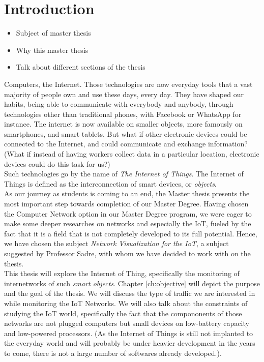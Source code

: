 \chapter*{Introduction}

\begin{itemize}
	\item Subject of master thesis
	\item Why this master thesis
	\item Talk about different sections of the thesis
\end{itemize}

Computers, the Internet. Those technologies are now everyday tools that a vast majority of people own and use these days, every day. They have shaped our habits, being able to communicate with everybody and anybody, through technologies other than traditional phones, with Facebook or WhatsApp for instance. The internet is now available on smaller objects, more famously on smartphones, and smart tablets. But what if other electronic devices could be connected to the Internet, and could communicate and exchange information? (What if instead of having workers collect data in a particular location, electronic devices could do this task for us?)\\

Such technologies go by the name of \textit{The Internet of Things}. The Internet of Things is defined as the interconnection of smart devices, or \textit{objects}. \\

As our journey as students is coming to an end, the Master thesis presents the most important step towards completion of our Master Degree.  Having chosen the Computer Network option in our Master Degree program, we were eager to make some deeper researches on networks and especially the IoT, fueled by the fact that it is a field that is not completely developed to its full potential. Hence, we have chosen the subject \textit{Network Visualization for the IoT}, a subject suggested by Professor Sadre, with whom we have decided to work with on the thesis. \\

This thesis will explore the Internet of Thing, specifically the monitoring of internetworks of such \textit{smart objects}. Chapter \ref{ch:objective} will depict the purpose and the goal of the thesis. We will discuss the type of traffic we are interested in while monitoring the IoT Networks. We will also talk about the constraints of studying the IoT world, specifically the fact that the compononents of those networks are not plugged computers but small devices on low-battery capacity and low-powered processors. (As the Internet of Things is still not implanted to the everyday world and will probably be under heavier development in the years to come, there is not a large number of softwares already developed.).\\

